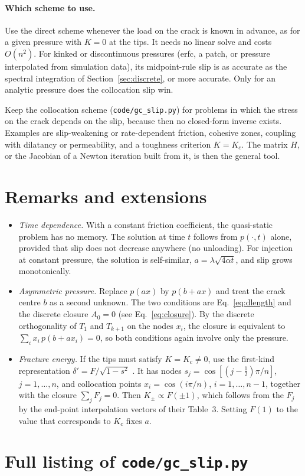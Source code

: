 \documentclass[12pt]{article}
\begin{document}
\paragraph{Which scheme to use.} Use the direct scheme whenever the load on
the crack is known in advance, as for a given pressure with $K=0$ at the tips.
It needs no linear solve and costs $O(n^2)$. For kinked or discontinuous
pressures (erfc, a patch, or pressure interpolated from simulation data), its
midpoint-rule slip is as accurate as the spectral integration of
Section~\ref{sec:discrete}, or more accurate. Only for an analytic pressure does the
collocation slip win.

Keep the collocation scheme (\texttt{code/gc\_slip.py}) for problems in which the
stress on the crack depends on the slip, because then no closed-form inverse
exists. Examples are slip-weakening or rate-dependent friction, cohesive zones,
coupling with dilatancy or permeability, and a toughness criterion $K=K_c$. The
matrix $H$, or the Jacobian of a Newton iteration built from it, is then the
general tool.

\section{Remarks and extensions}

\begin{itemize}
	\item \emph{Time dependence.} With a constant friction coefficient, the
	      quasi-static problem has no memory. The solution at time $t$ follows
	      from $p(\cdot,t)$ alone, provided that slip does not decrease anywhere
	      (no unloading). For injection at constant pressure, the solution is
	      self-similar, $a=\lambda\sqrt{4\alpha t}$, and slip grows monotonically.
	\item \emph{Asymmetric pressure.} Replace $p(ax)$ by $p(b+ax)$ and treat the
	      crack centre $b$ as a second unknown. The two conditions are
	      Eq.~\eqref{eq:dlength} and the discrete closure $A_0 = 0$ (see
	      Eq.~\ref{eq:closure}). By the discrete orthogonality of $T_1$ and
	      $T_{k+1}$ on the nodes $x_i$, the closure is equivalent to
	      $\sum_i x_i\,p(b+ax_i) = 0$, so both conditions again involve only the
	      pressure.
	\item \emph{Fracture energy.} If the tips must satisfy $K=K_c\neq0$, use the
	      first-kind representation $\delta' = F/\sqrt{1-s^2}$
	      \parencite[Sec.~3.1]{ViescaGaragash2018}. It has nodes
	      $s_j = \cos[(j-\frac12)\pi/n]$, $j=1,\dots,n$, and collocation points
	      $x_i=\cos(i\pi/n)$, $i=1,\dots,n-1$, together with the closure
	      $\sum_jF_j=0$. Then $K_\pm\propto F(\pm1)$, which follows from the
	      $F_j$ by the end-point interpolation vectors of their Table~3. Setting
	      $F(1)$ to the value that corresponds to $K_c$ fixes $a$.
\end{itemize}

\printbibliography

\appendix
\section{Full listing of \texttt{code/gc\_slip.py}}\label{app:listing}

\end{document}
